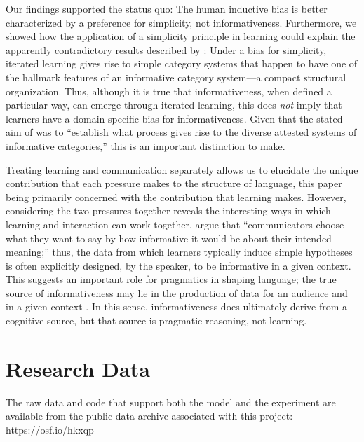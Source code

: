 \documentclass[doc,biblatex]{apa7}
\begin{document}
Our findings supported the status quo: The human inductive bias is better characterized by a preference for simplicity, not informativeness. Furthermore, we showed how the application of a simplicity principle in learning could explain the apparently contradictory results described by \textcite{Carstensen:2015}: Under a bias for simplicity, iterated learning gives rise to simple category systems that happen to have one of the hallmark features of an informative category system---a compact structural organization. Thus, although it is true that informativeness, when defined a particular way, can emerge through iterated learning, this does \textit{not} imply that learners have a domain-specific bias for informativeness. Given that the stated aim of \textcite[p.~303]{Carstensen:2015} was to ``establish what process gives rise to the diverse attested systems of informative categories,'' this is an important distinction to make.

Treating learning and communication separately allows us to elucidate the unique contribution that each pressure makes to the structure of language, this paper being primarily concerned with the contribution that learning makes. However, considering the two pressures together reveals the interesting ways in which learning and interaction can work together. \textcite[][p.~1228]{Frank:2009} argue that ``communicators choose what they want to say by how informative it would be about their intended meaning;'' thus, the data from which learners typically induce simple hypotheses is often explicitly designed, by the speaker, to be informative in a given context. This suggests an important role for pragmatics in shaping language; the true source of informativeness may lie in the production of data for an audience \parencite[as argued by][]{Kirby:2015} and in a given context \parencite[as argued by][]{Winters:2018}. In this sense, informativeness does ultimately derive from a cognitive source, but that source is pragmatic reasoning, not learning.

\section{Research Data}

The raw data and code that support both the model and the experiment are available from the public data archive associated with this project: https://osf.io/hkxqp
\end{document}
